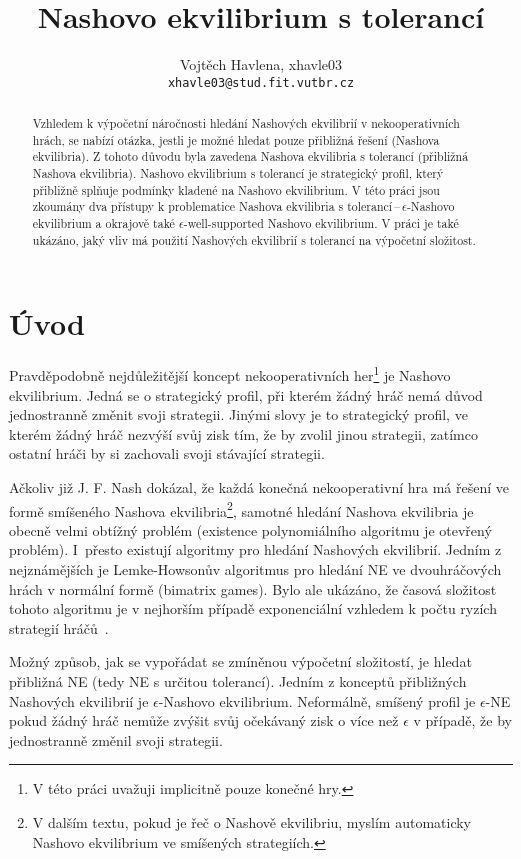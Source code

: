\documentclass[a4paper,12pt]{article}
\title{\bf Nashovo ekvilibrium s tolerancí}
\author{Vojtěch Havlena, xhavle03\\ \texttt{xhavle03@stud.fit.vutbr.cz}}
\date{}
\begin{document}
\maketitle

\begin{abstract}
  Vzhledem k výpočetní náročnosti hledání Nashových ekvilibrií v nekooperativních hrách, se nabízí otázka, 
  jestli je možné hledat pouze přibližná řešení (Nashova ekvilibria).
  Z tohoto důvodu byla zavedena Nashova ekvilibria s tolerancí (přibližná Nashova ekvilibria). Nashovo ekvilibrium s tolerancí je 
  strategický profil, který přibližně splňuje podmínky kladené na Nashovo ekvilibrium. V této práci jsou
  zkoumány dva přístupy k problematice Nashova ekvilibria s tolerancí\,--\,$\epsilon$-Nashovo ekvilibrium a
  okrajově také $\epsilon$-well-supported Nashovo ekvilibrium. V práci je také ukázáno, jaký vliv má použití Nashových 
  ekvilibrií s tolerancí na výpočetní složitost.
\end{abstract}

\section{Úvod}
Pravděpodobně nejdůležitější koncept nekooperativních her\footnote{V této práci uvažuji implicitně pouze konečné hry.} je Nashovo ekvilibrium. Jedná se o strategický profil, při kterém 
žádný hráč nemá důvod jednostranně změnit svoji strategii. Jinými slovy je to strategický profil, ve kterém žádný hráč 
nezvýší svůj zisk tím, že by zvolil jinou strategii, zatímco ostatní hráči by si zachovali svoji stávající strategii.

Ačkoliv již J. F. Nash dokázal, že každá konečná nekooperativní hra má řešení ve formě smíšeného Nashova ekvilibria\footnote{V dalším textu, pokud je řeč o Nashově ekvilibriu, myslím automaticky Nashovo ekvilibrium ve smíšených strategiích.}, 
samotné hledání Nashova ekvilibria je obecně velmi obtížný problém (existence polynomiálního algoritmu je 
otevřený problém). I~přesto existují algoritmy pro hledání Nashových ekvilibrií. Jedním
z nejznámějších je Lemke-Howsonův algoritmus pro hledání NE ve dvouhráčových hrách v normální formě (bimatrix games). Bylo ale ukázáno, že časová složitost tohoto
algoritmu je v nejhorším případě exponenciální vzhledem k počtu ryzích strategií hráčů~\cite{ECTA:ECTA667}. 

Možný způsob, jak se vypořádat se zmíněnou výpočetní složitostí, je hledat přibližná NE (tedy NE s určitou tolerancí). 
Jedním z konceptů přibližných Nashových ekvilibrií je $\epsilon$-Nashovo ekvilibrium.
Neformálně, smíšený profil je $\epsilon$-NE pokud žádný hráč nemůže zvýšit svůj očekávaný zisk o více než 
$\epsilon$ v případě, že by jednostranně změnil svoji strategii.
\end{document}
